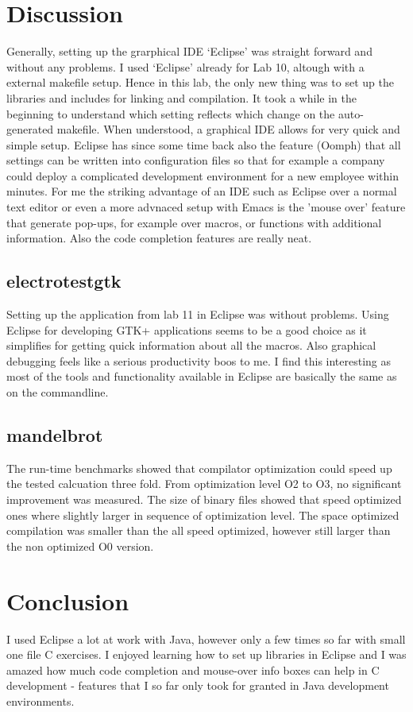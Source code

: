 \documentclass[a4paper,11pt,twoside]{article}
\begin{document}
\section{Discussion}
Generally, setting up the grarphical IDE `Eclipse' was straight forward and without
any problems. I used `Eclipse' already for Lab 10, altough with a external makefile
setup. Hence in this lab, the only new thing was to set up the libraries and
includes for linking and compilation. It took a while in the beginning to understand
which setting reflects which change on the auto-generated makefile. When understood,
a graphical IDE allows for very quick and simple setup. Eclipse has since some time
back also the feature (Oomph) that all settings can be written into configuration files so
that for example a company could deploy a complicated development environment for
a new employee within minutes. For me the striking advantage of an IDE such as Eclipse
over a normal text editor or even a more advnaced setup with Emacs is the 'mouse over'
feature that generate pop-ups, for example over macros, or functions with additional
information. Also the code completion features are really neat.

\subsection{electrotestgtk}
Setting up the application from lab 11 in Eclipse was without problems. Using
Eclipse for developing GTK+ applications seems to be a good choice as it simplifies
for getting quick information about all the macros. Also graphical debugging feels
like a serious productivity boos to me. I find this interesting as most of the tools
and functionality available in Eclipse are basically the same as on the commandline.



\subsection{mandelbrot}
The run-time benchmarks showed that compilator optimization could speed up
the tested calcuation three fold. From optimization level O2 to O3, no significant
improvement was measured. The size of binary files showed that speed optimized
ones where slightly larger in sequence of optimization level. The space optimized
compilation was smaller than the all speed optimized, however still larger than
the non optimized O0 version.

\section{Conclusion}
I used Eclipse a lot at work with Java, however only a few times so far with
small one file C exercises. I enjoyed learning how to set up libraries in Eclipse
and I was amazed how much code completion and mouse-over info boxes can help in
C development - features that I so far only took for granted in Java development
environments.
\end{document}
